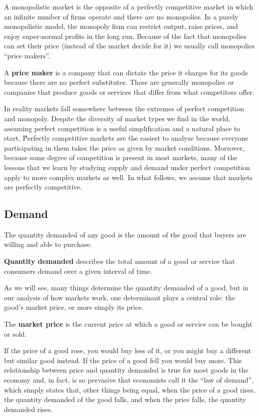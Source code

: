 A monopolistic market is the opposite of a perfectly competitive market in which an infinite number of firms operate
and there are no monopolies. In a purely monopolistic model, the monopoly firm can restrict output, raise prices, and
enjoy super-normal profits in the long run. Because of the fact that monopolies can set their price (instead of the
market decide for it) we usually call monopolies ``price makers''.

A \textbf{price maker} is a company that can dictate the price it charges for its goods because there are no perfect
substitutes. These are generally monopolies or companies that produce goods or services that differ from what
competitors offer.
\ed

In reality markets fall somewhere between the extremes of perfect competition and monopoly. Despite the diversity of
market types we find in the world, assuming perfect competition is a useful simplification and a natural place to
start. \v

Perfectly competitive markets are the easiest to analyze because everyone participating in them takes the price as
given by market conditions. Moreover, because some degree of competition is present in most markets, many of the
lessons that we learn by studying supply and demand under perfect competition apply to more complex markets as well.
In what follows, we assume that markets are perfectly competitive.

\subsection{Demand}

The quantity demanded of any good is the amount of the good that buyers are willing and able to purchase.

\textbf{Quantity demanded} describes the total amount of a good or service that consumers demand over a given interval
of time.
\ed

As we will see, many things determine the quantity demanded of a good, but in our analysis of how markets work, one
determinant plays a central role: the good's market price, or more simply its price.

The \textbf{market price} is the current price at which a good or service can be bought or sold.
\ed

If the price of a good rose, you would buy less of it, or you might buy a different but similar good instead. If the
price of a good fell you would buy more. This relationship between price and quantity demanded is true for most goods
in the economy and, in fact, is so pervasive that economists call it the ``law of demand'', which simply states that,
other things being equal, when the price of a good rises, the quantity demanded of the good falls, and when the price
falls, the quantity demanded rises.


